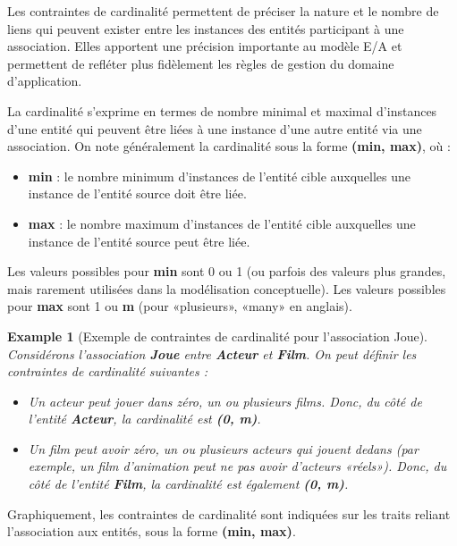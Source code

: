 \documentclass{article}
\newtheorem{example}{Example}
\begin{document}
Les contraintes de cardinalité permettent de préciser la nature et le nombre de liens qui peuvent exister entre les instances des entités participant à une association. Elles apportent une précision importante au modèle E/A et permettent de refléter plus fidèlement les règles de gestion du domaine d'application.

La cardinalité s'exprime en termes de nombre minimal et maximal d'instances d'une entité qui peuvent être liées à une instance d'une autre entité via une association.  On note généralement la cardinalité sous la forme \textbf{(min, max)}, où :

\begin{itemize}
    \item \textbf{min} :  le nombre minimum d'instances de l'entité cible auxquelles une instance de l'entité source doit être liée.
    \item \textbf{max} :  le nombre maximum d'instances de l'entité cible auxquelles une instance de l'entité source peut être liée.
\end{itemize}

Les valeurs possibles pour \textbf{min} sont 0 ou 1 (ou parfois des valeurs plus grandes, mais rarement utilisées dans la modélisation conceptuelle).  Les valeurs possibles pour \textbf{max} sont 1 ou \textbf{m} (pour «plusieurs», «many» en anglais).

\begin{example}[Exemple de contraintes de cardinalité pour l'association Joue]
    Considérons l'association \textbf{Joue} entre \textbf{Acteur} et \textbf{Film}.  On peut définir les contraintes de cardinalité suivantes :

    \begin{itemize}
        \item Un acteur peut jouer dans zéro, un ou plusieurs films.  Donc, du côté de l'entité \textbf{Acteur}, la cardinalité est \textbf{(0, m)}.
        \item Un film peut avoir zéro, un ou plusieurs acteurs qui jouent dedans (par exemple, un film d'animation peut ne pas avoir d'acteurs «réels»).  Donc, du côté de l'entité \textbf{Film}, la cardinalité est également \textbf{(0, m)}.
    \end{itemize}
\end{example}

Graphiquement, les contraintes de cardinalité sont indiquées sur les traits reliant l'association aux entités, sous la forme \textbf{(min, max)}.
\end{document}
